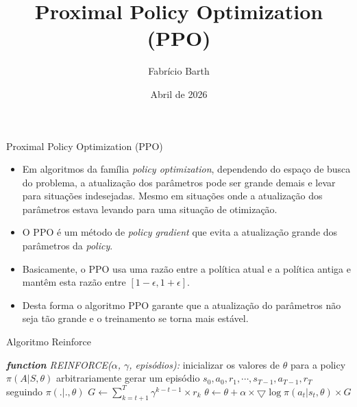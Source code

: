 \documentclass{beamer}
\begin{document}
	
\title{Proximal Policy Optimization (PPO)} 
\author{Fabrício Barth}
\date{Abril de 2026}
	
\maketitle

\def\HiLi{\leavevmode\rlap{\hbox to \hsize{\color{yellow!50}\leaders\hrule height .8\baselineskip depth .5ex\hfill}}}
	
\def\TA{\leavevmode\rlap{\hbox to \hsize{\color{cyan!50}\leaders\hrule height .8\baselineskip depth .5ex\hfill}}}

\def\TB{\leavevmode\rlap{\hbox to \hsize{\color{red!50}\leaders\hrule height .8\baselineskip depth .5ex\hfill}}}
	
\begin{frame}{Proximal Policy Optimization (PPO)}
	\begin{itemize}
		\item Em algoritmos da família \textit{policy optimization}, dependendo do espaço de busca do problema, a atualização dos parâmetros pode ser grande demais e levar para situações indesejadas. Mesmo em situações onde a atualização dos parâmetros estava levando para uma situação de otimização. 
		\item O PPO é um método de \textit{policy gradient} que evita a atualização grande dos parâmetros da \textit{policy}.
		\item Basicamente, o PPO usa uma razão entre a política atual e a política antiga e mantêm esta razão entre $\left[ 1 - \epsilon, 1 + \epsilon \right]$.
		\item Desta forma o algoritmo PPO garante que a atualização do parâmetros não seja tão grande e o treinamento se torna mais estável. 
	\end{itemize}
	
	
\end{frame}
	

\begin{frame}{Algoritmo Reinforce}
	\begin{algorithmic} 
		\STATE \emph{\textbf{function} REINFORCE($\alpha$, $\gamma$, episódios):}
		\STATE inicializar os valores de $\theta$ para a policy $\pi(A|S,\theta)$ arbitrariamente
		\STATE gerar um episódio ${s_{0},a_{0},r_{1},\cdots,s_{T-1},a_{T-1},r_{T}}$ seguindo $\pi(.|.,\theta)$
			\STATE $G \leftarrow \sum_{k=t+1}^{T} \gamma^{k-t-1} \times r_{k}$
			\STATE $\theta \leftarrow \theta + \alpha \times \bigtriangledown \log \pi(a_{t}|s_{t}, \theta) \times G$
		\ENDFOR
		\ENDFOR
	\end{algorithmic}
\end{frame}
\end{document}
